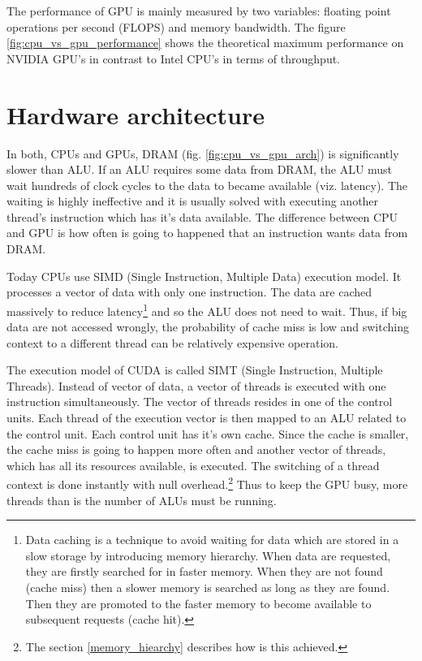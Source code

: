 \documentclass[12pt,oneside]{fithesis2}
\begin{document}
The performance of GPU is mainly measured by two variables: floating point operations per second (FLOPS) and memory bandwidth. The figure \ref{fig:cpu_vs_gpu_performance} shows the theoretical maximum performance on NVIDIA GPU's in contrast to Intel CPU's in terms of throughput.

\section{Hardware architecture}
\label{cuda_architecture}

In both, CPUs and GPUs, DRAM (fig. \ref{fig:cpu_vs_gpu_arch}) is significantly slower than ALU. If an ALU requires some data from DRAM, the ALU must wait hundreds of clock cycles to the data to became available (viz. latency). The waiting is highly ineffective and it is usually solved with executing another thread's instruction which has it's data available. The difference between CPU and GPU is how often is going to happened that an instruction wants data from DRAM.

Today CPUs use SIMD (Single Instruction, Multiple Data) execution model. It processes a vector of data with only one instruction. The data are cached massively to reduce latency\footnote{Data caching is a technique to avoid waiting for data which are stored in a slow storage by introducing memory hierarchy. When data are requested, they are firstly searched for in faster memory. When they are not found (cache miss) then a slower memory is searched as long as they are found. Then they are promoted to the faster memory to become available to subsequent requests (cache hit).} and so the ALU does not need to wait. Thus, if big data are not accessed wrongly, the probability of cache miss is low and switching context to a different thread can be relatively expensive operation. 

The execution model of CUDA is called SIMT (Single Instruction, Multiple Threads). Instead of vector of data, a vector of threads is executed with one instruction simultaneously. The vector of threads resides in one of the control units. Each thread of the execution vector is then mapped to an ALU related to the control unit. Each control unit has it's own cache. Since the cache is smaller, the cache miss is going to happen more often and another vector of threads, which has all its resources available, is executed. The switching of a thread context is done instantly with null overhead.\footnote{The section \ref{memory_hiearchy} describes how is this achieved.} Thus to keep the GPU busy, more threads than is the number of ALUs must be running.
\end{document}
